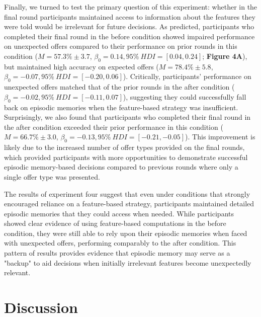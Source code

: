 \documentclass[10pt,letterpaper]{article}
\begin{document}
Finally, we turned to test the primary question of this experiment: whether in the final round participants maintained access to information about the features they were told would be irrelevant for future decisions. As predicted, participants who completed their final round in the before condition showed impaired performance on unexpected offers compared to their performance on prior rounds in this condition ($M = 57.3\% \pm 3.7$, $\beta_{0} = 0.14, 95\% \ HDI = [0.04, 0.24]$; \textbf{Figure 4A}), but maintained high accuracy on expected offers ($M = 78.4\% \pm 5.8$, $\beta_{0} = -0.07, 95\% \ HDI = [-0.20, 0.06]$). Critically, participants' performance on unexpected offers matched that of the prior rounds in the after condition ($\beta_{0} = -0.02, 95\% \ HDI = [-0.11, 0.07]$), suggesting they could successfully fall back on episodic memories when the feature-based strategy was insufficient. Surprisingly, we also found that participants who completed their final round in the after condition exceeded their prior performance in this condition ($M = 66.7\% \pm 3.0$, $\beta_{0} = -0.13,  95\% \ HDI = [-0.21, -0.05]$). This improvement is likely due to the increased number of offer types provided on the final rounds, which provided participants with more opportunities to demonstrate successful episodic memory-based decisions compared to previous rounds where only a single offer type was presented.

The results of experiment four suggest that even under conditions that strongly encouraged reliance on a feature-based strategy, participants maintained detailed episodic memories that they could access when needed. While participants showed clear evidence of using feature-based computations in the before condition, they were still able to rely upon their episodic memories when faced with unexpected offers, performing comparably to the after condition. This pattern of results provides evidence that episodic memory may serve as a "backup" to aid decisions when initially irrelevant features become unexpectedly relevant.

\section{Discussion}
\end{document}
